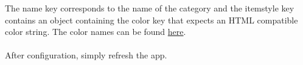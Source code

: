 \documentclass{article}
\begin{document}
The name key corresponds to the name of the category and the itemstyle key contains an object containing the color key that expects an HTML compatible color string. The color names can be found \href{https://www.w3schools.com/tags/ref_colornames.asp}{here}.
\\\\
After configuration, simply refresh the app. 
\end{document}
